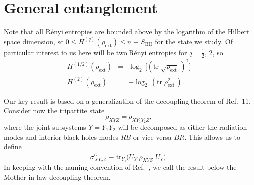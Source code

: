 \documentclass[twocolumn,aps,prl]{revtex4}
\begin{document}
\section{General entanglement}
\label{decoupling}

Note that all R\'enyi entropies are bounded above by the logarithm of
the Hilbert space dimension, so
 $0\le H^{(q)}(\rho_{\text{ext}})\le n\equiv S_{\text{BH}}$
for the state we study. Of particular interest to us here will be two
R\'enyi entropies for $q=\frac{1}{2}$, $2$, so
\begin{eqnarray}
H^{(1/2)}(\rho_{\text{ext}}) &=&\log_2
 \,\bigl[({\text{tr}}\;\sqrt{\rho_{\text{ext}}}\,)^2\bigr] \nonumber \\
H^{(2)}(\rho_{\text{ext}}) &=&-\log_2
\,({\text{tr}}\;{\rho^2_{\text{ext}}}\,).
\end{eqnarray}

Our key result is based on a generalization of the decoupling theorem of
Ref.~11. Consider now the tripartite state
\begin{equation}
\rho_{XYZ}^{\text{~}}=
\rho_{XY_1Y_2Z}^{\text{~}},
\end{equation}
where the joint subsystems $Y=Y_1Y_2$ will be decomposed as either
the radiation modes and interior black holes modes $RB$ or vice-versa
$BR$. This allows us to define
\begin{equation}
\sigma_{XY_2Z}^U\equiv
\text{tr}_{Y_1}^{\text{~}} \bigl(U_{Y}\;
\rho_{XYZ}^{\text{~}}\; U_{Y}^\dagger\bigr).
\end{equation}
In keeping with the naming convention of Ref.~,
we call the result
below the Mother-in-law decoupling theorem.

\end{document}
